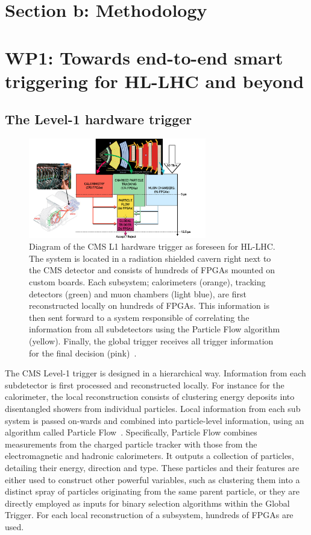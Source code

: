 \documentclass[12pt]{iopart}
\begin{document}
\section{Section b: Methodology}


\section{WP1: Towards end-to-end smart triggering for HL-LHC and beyond}
\subsection{The Level-1 hardware trigger}
\begin{figure}[ht]
    \centering
    \includegraphics[width=0.69\textwidth]{figures/phase2_l1t.pdf}
    \caption{Diagram of the CMS L1 hardware trigger as foreseen for HL-LHC. The system is located in a radiation shielded cavern right next to the CMS detector and consists of hundreds of FPGAs mounted on custom boards. Each subsystem; calorimeters (orange), tracking detectors (green) and muon chambers (light blue), are first reconstructed locally on  hundreds of FPGAs. This information is then sent forward to a system responsible of correlating the information from all subdetectors using the Particle Flow algorithm (yellow). Finally, the global trigger receives all trigger information for the final decision (pink)~\cite{tdr}.}
    \label{fig:phase2}
\end{figure}
The CMS Level-1 trigger is designed in a hierarchical way. Information from each subdetector is first processed and reconstructed locally. For instance for the calorimeter, the local reconstruction consists of clustering energy deposits into disentangled showers from individual particles. Local information from each sub system is passed on-wards and combined into particle-level information, using an algorithm called Particle Flow~\cite{Sirunyan_2017}. Specifically, Particle Flow combines measurements from the charged particle tracker with those from the electromagnetic and hadronic calorimeters. It outputs a collection of particles, detailing their energy, direction and type. These particles and their features are either used to construct other powerful variables, such as clustering them into a distinct spray of particles originating from the same parent particle, or they are directly employed as inputs for binary selection algorithms within the Global Trigger. For each local reconstruction of a subsystem, hundreds of FPGAs are used.
\end{document}
